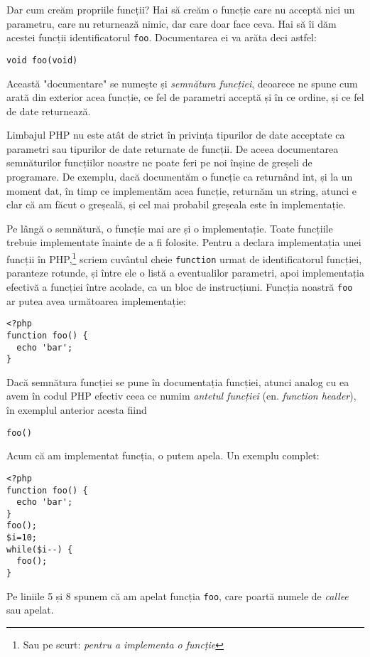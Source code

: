 Dar cum creăm propriile funcții? Hai să creăm o funcție care nu acceptă nici un
parametru, care nu returnează nimic, dar care doar face ceva. Hai să îi dăm acestei
funcții identificatorul \texttt{foo}. Documentarea ei va arăta deci astfel:
\begin{verbatim}
void foo(void)
\end{verbatim}
Această "documentare" se numește și \textsl{semnătura funcției}, deoarece
ne spune cum arată din exterior acea funcție, ce fel de parametri acceptă
și în ce ordine, și ce fel de date returnează.

Limbajul PHP nu este at\^at de strict \^in privința tipurilor de date
acceptate ca parametri sau tipurilor de date returnate de funcții. De aceea
documentarea semnăturilor funcțiilor noastre ne poate feri pe noi \^inșine
de greșeli de programare. De exemplu, dacă documentăm o funcție ca return\^and
{\glqq}int{\grqq}, și la un moment dat, \^in timp ce implementăm acea funcție,
returnăm un {\glqq}string{\grqq}, atunci e clar că am făcut o greșeală, și cel
mai probabil greșeala este \^in implementație.





Pe lângă o semnătură, o funcție mai are și o implementație. Toate funcțiile
trebuie implementate înainte de a fi folosite. Pentru a declara
implementația unei funcții în PHP,\footnote{Sau pe scurt: \textit{pentru
a implementa o funcție}}
scriem cuvântul cheie \texttt{function} urmat de identificatorul funcției,
paranteze rotunde, și între ele o listă a eventualilor parametri,
apoi implementația efectivă a funcției între acolade, ca un bloc
de instrucțiuni. Funcția
noastră \texttt{foo} ar putea avea următoarea implementație:
\begin{lstlisting}
<?php
function foo() {
  echo 'bar';
}
\end{lstlisting}
Dacă semnătura funcției se pune \^in documentația funcției, atunci analog cu ea
avem \^in codul PHP efectiv ceea ce numim \textsl{antetul funcției} (en. \textsl{function header}),
\^in exemplul anterior acesta fiind
\begin{verbatim}
foo()
\end{verbatim}


Acum că am implementat funcția, o putem apela. Un exemplu complet:
\begin{lstlisting}
<?php
function foo() {
  echo 'bar';
}
foo();
$i=10;
while($i--) {
  foo();
}
\end{lstlisting}
Pe liniile 5 și 8 spunem că am apelat funcția \texttt{foo}, care poartă numele
de \textsl{callee} sau apelat.

